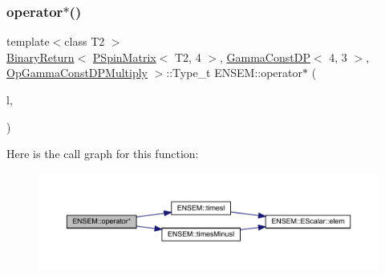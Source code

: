 \subsubsection{\texorpdfstring{operator$\ast$()}{operator*()}\hspace{0.1cm}{\footnotesize\ttfamily [52/64]}}
{\footnotesize\ttfamily template$<$class T2 $>$ \\
\mbox{\hyperlink{structENSEM_1_1BinaryReturn}{Binary\+Return}}$<$ \mbox{\hyperlink{classENSEM_1_1PSpinMatrix}{P\+Spin\+Matrix}}$<$ T2, 4 $>$, \mbox{\hyperlink{classENSEM_1_1GammaConstDP}{Gamma\+Const\+DP}}$<$ 4, 3 $>$, \mbox{\hyperlink{structENSEM_1_1OpGammaConstDPMultiply}{Op\+Gamma\+Const\+D\+P\+Multiply}} $>$\+::Type\+\_\+t E\+N\+S\+E\+M\+::operator$\ast$ (\begin{DoxyParamCaption}\item[{const \mbox{\hyperlink{classENSEM_1_1PSpinMatrix}{P\+Spin\+Matrix}}$<$ T2, 4 $>$ \&}]{l,  }\item[{const \mbox{\hyperlink{classENSEM_1_1GammaConstDP}{Gamma\+Const\+DP}}$<$ 4, 3 $>$ \&}]{ }\end{DoxyParamCaption})\hspace{0.3cm}{\ttfamily [inline]}}

Here is the call graph for this function\+:\nopagebreak
\begin{figure}[H]
\begin{center}
\leavevmode
\includegraphics[width=350pt]{d6/df5/group__primspinmatrix_ga7049c9a95590816eb50f8755c19aac7e_cgraph}
\end{center}
\end{figure}
\mbox{\label{group__primspinmatrix_gabdda28125d8262f0d1b4f071aaa969eb}} 
